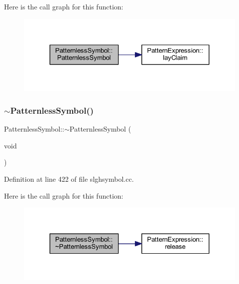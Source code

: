 Here is the call graph for this function\+:
\nopagebreak
\begin{figure}[H]
\begin{center}
\leavevmode
\includegraphics[width=324pt]{class_patternless_symbol_a26f3d4305a994ae113ae8e37ec90dddd_cgraph}
\end{center}
\end{figure}
\mbox{\label{class_patternless_symbol_a9f513a474e0c723c5784920a56a459e8}} 
\subsubsection{\texorpdfstring{$\sim$PatternlessSymbol()}{~PatternlessSymbol()}}
{\footnotesize\ttfamily Patternless\+Symbol\+::$\sim$\+Patternless\+Symbol (\begin{DoxyParamCaption}\item[{void}]{ }\end{DoxyParamCaption})\hspace{0.3cm}{\ttfamily [virtual]}}



Definition at line 422 of file slghsymbol.\+cc.

Here is the call graph for this function\+:
\nopagebreak
\begin{figure}[H]
\begin{center}
\leavevmode
\includegraphics[width=324pt]{class_patternless_symbol_a9f513a474e0c723c5784920a56a459e8_cgraph}
\end{center}
\end{figure}


